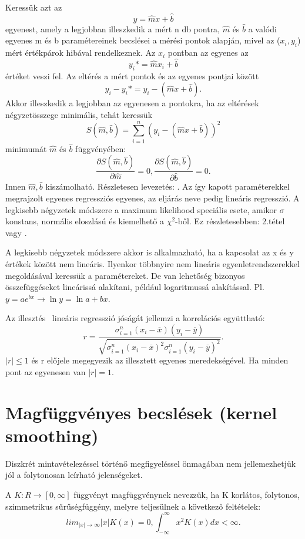\documentclass[12pt]{article}
\theoremstyle{plain}
\begin{document}
Keressük azt az $$ y = \hat{m}x+\hat{b} $$ egyenest, amely a legjobban illeszkedik a mért n db pontra, $\hat{m}$ és $\hat{b}$ a valódi egyenes m és b paramétereinek becslései a mérési pontok alapján, mivel az ($x_i, y_i$) mért értékpárok hibával rendelkeznek.  Az $x_i$ pontban az egyenes az $$ y_i* = \hat{m}x_i+\hat{b} $$ értéket veszi fel. Az eltérés a mért pontok és az egyenes pontjai között $$ y_i -y_i* = y_i - (\hat{m}x+\hat{b}). $$ Akkor illeszkedik a legjobban az egyenesen a pontokra, ha az eltérések négyzetösszege minimális, tehát keressük $$ S(\hat{m}, \hat{b}) = \sum_{i=1}^n (y_i - (\hat{m}x+\hat{b}) )^2 $$ minimumát $\hat{m}$ és $\hat{b}$ függvényében: $$ \frac{\partial S(\hat{m}, \hat{b})}{\partial \hat{m}} = 0, \frac{\partial S(\hat{m}, \hat{b})}{\partial \hat{b}} = 0. $$ Innen $\hat{m}, \hat{b}$ kiszámolható. Részletesen levezetés: \cite{klasszfiz}. Az így kapott paraméterekkel megrajzolt egyenes regressziós egyenes, az eljárás neve pedig lineáris regresszió.  A legkisebb négyzetek módszere a maximum likelihood speciális esete, amikor $\sigma $ konstans, normális eloszlású és kiemelhető a $\chi^2$-ből. Ez részletesebben: 2.tétel vagy \cite{dobos}. 

A legkisebb négyzetek módszere akkor is alkalmazható, ha a kapcsolat az x és y értékek között nem lineáris. Ilyenkor többnyire nem lineáris egyenletrendszerekkel megoldásával keressük a paramétereket. De van lehetőség bizonyos összefüggéseket lineárissá alakítani, például logaritmussá alakítással. Pl. $y = a e ^ {bx} \rightarrow \ln y = \ln a + bx$.  

Az illesztés \ lineáris regresszió jóságát jellemzi a  korrelációs együttható:
$$ r = \frac{\sigma_{i=1}^n (x_i - \overline{x}) (y_i - \overline{y})}{\sqrt{ \sigma_{i=1}^n (x_i - \overline{x})^2 \sigma_{i=1}^n (y_i - \overline{y})^2}}. 
$$ $|r| \leq 1 $ és r előjele megegyezik az illesztett egyenes meredekségével. Ha minden pont az egyenesen van $|r| = 1 $. 

\section*{Magfüggvényes becslések (kernel smoothing)}
Diszkrét  mintavételezéssel történő megfigyeléssel önmagában nem jellemezhetjük jól a folytonosan leírható jelenségeket. 

A $K:R \rightarrow [0, \infty]$  függvényt magfüggvénynek nevezzük, ha K korlátos, folytonos, szimmetrikus sűrűségfüggény, melyre teljesülnek a következő feltételek: 
$$ lim_{|x| \rightarrow \infty} |x| K(x) = 0, \int_{-\infty}^{\infty}  x^2 K(x) dx < \infty. $$
\end{document}
